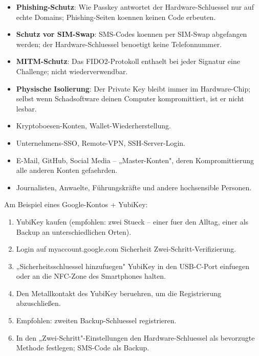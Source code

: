 
\begin{itemize}
  \item \textbf{Phishing-Schutz}: Wie Passkey antwortet der Hardware-Schluessel nur auf echte Domains; Phishing-Seiten koennen keinen Code erbeuten.
  \item \textbf{Schutz vor SIM-Swap}: SMS-Codes koennen per SIM-Swap abgefangen werden; der Hardware-Schluessel benoetigt keine Telefonnummer.
  \item \textbf{MITM-Schutz}: Das FIDO2-Protokoll enthaelt bei jeder Signatur eine Challenge; nicht wiederverwendbar.
  \item \textbf{Physische Isolierung}: Der Private Key bleibt immer im Hardware-Chip; selbst wenn Schadsoftware deinen Computer kompromittiert, ist er nicht lesbar.
\end{itemize}


\begin{itemize}
  \item Kryptoboesen-Konten, Wallet-Wiederherstellung.
  \item Unternehmens-SSO, Remote-VPN, SSH-Server-Login.
  \item E-Mail, GitHub, Social Media – „Master-Konten", deren Kompromittierung alle anderen Konten gefaehrden.
  \item Journalisten, Anwaelte, Führungskräfte und andere hochsensible Personen.
\end{itemize}


Am Beispiel eines Google-Kontos + YubiKey:

\begin{enumerate}
  \item YubiKey kaufen (empfohlen: zwei Stueck – einer fuer den Alltag, einer als Backup an unterschiedlichen Orten).
  \item Login auf myaccount.google.com Sicherheit Zwei-Schritt-Verifizierung.
  \item „Sicherheitsschluessel hinzufuegen" YubiKey in den USB-C-Port einfuegen oder an die NFC-Zone des Smartphones halten.
  \item Den Metallkontakt des YubiKey beruehren, um die Registrierung abzuschließen.
  \item Empfohlen: zweiten Backup-Schluessel registrieren.
  \item In den „Zwei-Schritt"-Einstellungen den Hardware-Schluessel als bevorzugte Methode festlegen; SMS-Code als Backup.
\end{enumerate}


